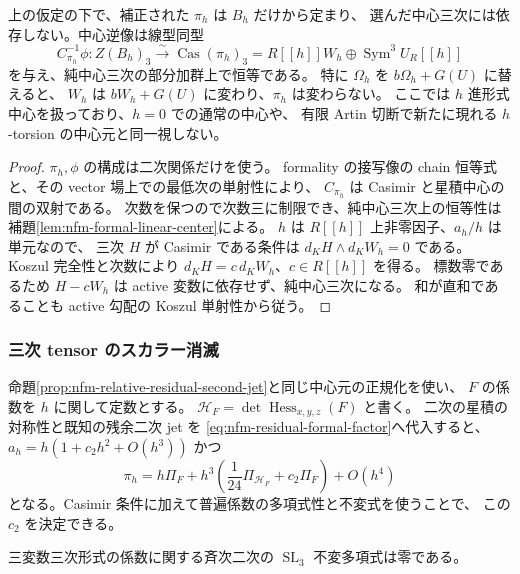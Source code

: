 \begin{corollary}
\label{cor:nfm-formal-center-casimir}
上の仮定の下で、補正された $\pi_h$ は $B_h$ だけから定まり、
選んだ中心三次には依存しない。中心逆像は線型同型
\[
 C_{\pi_h}^{-1}\phi:
 Z(B_h)_3\xrightarrow{\sim}
 \operatorname{Cas}(\pi_h)_3
 =R[[h]]W_h\oplus\operatorname{Sym}^3 U_R[[h]]
\]
を与え、純中心三次の部分加群上で恒等である。
特に $\Omega_h$ を $b\Omega_h+G(U)$ に替えると、
$W_h$ は $bW_h+G(U)$ に変わり、$\pi_h$ は変わらない。
ここでは $h$ 進形式中心を扱っており、$h=0$ での通常の中心や、
有限 Artin 切断で新たに現れる $h$-torsion の中心元と同一視しない。
\end{corollary}

\begin{proof}
$\pi_h,\phi$ の構成は二次関係だけを使う。
formality の接写像の chain 恒等式と、その vector 場上での最低次の単射性により、
$C_{\pi_h}$ は Casimir と星積中心の間の双射である。
次数を保つので次数三に制限でき、純中心三次上の恒等性は
補題\ref{lem:nfm-formal-linear-center}による。
$h$ は $R[[h]]$ 上非零因子、$a_h/h$ は単元なので、
三次 $H$ が Casimir である条件は
$d_KH\wedge d_KW_h=0$ である。
Koszul 完全性と次数により $d_KH=c\,d_KW_h$、$c\in R[[h]]$ を得る。
標数零であるため $H-cW_h$ は active 変数に依存せず、純中心三次になる。
和が直和であることも active 勾配の Koszul 単射性から従う。
\end{proof}

\subsubsection{三次 tensor のスカラー消滅}

命題\ref{prop:nfm-relative-residual-second-jet}と同じ中心元の正規化を使い、
$F$ の係数を $h$ に関して定数とする。
$\mathscr H_F=\det\operatorname{Hess}_{x,y,z}(F)$ と書く。
二次の星積の対称性と既知の残余二次 jet を
\eqref{eq:nfm-residual-formal-factor}へ代入すると、
$a_h=h(1+c_2h^2+O(h^3))$ かつ
\begin{equation}
\label{eq:nfm-corrected-poisson-third}
 \pi_h=h\Pi_F+h^3\left(\frac1{24}\Pi_{\mathscr H_F}
                  +c_2\Pi_F\right)+O(h^4)
\end{equation}
となる。Casimir 条件に加えて普遍係数の多項式性と不変式を使うことで、
この $c_2$ を決定できる。

\begin{lemma}[三変数三次形式の二次不変式]
\label{lem:nfm-no-quadratic-cubic-invariant}
三変数三次形式の係数に関する斉次二次の
$\operatorname{SL}_3$ 不変多項式は零である。
\end{lemma}

